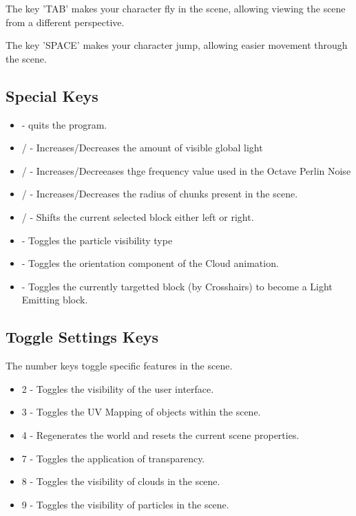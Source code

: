 \documentclass{book}
\begin{document}
The key 'TAB' makes your character fly in the scene, allowing viewing the scene from a different perspective.
      
The key 'SPACE' makes your character jump, allowing easier movement through the scene.
      
\subsection{Special Keys}
\begin{itemize}
	\item {} - quits the program. 
	\item {}/ - Increases/Decreases the amount of visible global light
	\item {}/ - Increases/Decreeases thge frequency value used in the Octave Perlin Noise
	\item {}/ - Increases/Decreases the radius of chunks present in the scene.
	\item {}/ - Shifts the current selected block either left or right.
	\item {} - Toggles the particle visibility type
	\item {} - Toggles the orientation component of the Cloud animation.
	\item {} - Toggles the currently targetted block (by Crosshairs) to become a Light Emitting block.
\end{itemize}
      
\subsection{Toggle Settings Keys}
The number keys toggle specific features in the scene.
      
\begin{itemize}
	\item 2 - Toggles the visibility of the user interface.
	\item 3 - Toggles the UV Mapping of objects within the scene.
	\item 4 - Regenerates the world and resets the current scene properties.
	\item 7 - Toggles the application of transparency.
	\item 8 - Toggles the visibility of clouds in the scene.
	\item 9 - Toggles the visibility of particles in the scene.
\end{itemize}
\end{document}

